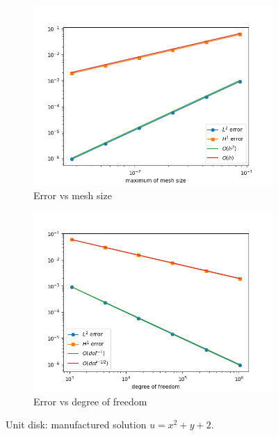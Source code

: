 \documentclass[12pt]{article}%
\theoremstyle{plain}
\numberwithin{equation}{section}
\begin{document}
 \begin{figure}[H]%
    \centering
         \begin{subfigure}[h]{0.45\linewidth}
          \caption{Error vs mesh size}
\includegraphics[width=\linewidth]{figures/Ex3/disk_test2.png}
\end{subfigure}
  \begin{subfigure}[h]{0.45\linewidth}
   \caption{Error vs degree of freedom}
\includegraphics[width=\linewidth]{figures/Ex3/disk_test2_dof.png}
\end{subfigure}
  \caption{Unit disk: manufactured solution $u=x^2+y+2$.}
  \label{fig:Ex3_disk_test_2}
 \end{figure}
 
\end{document}
